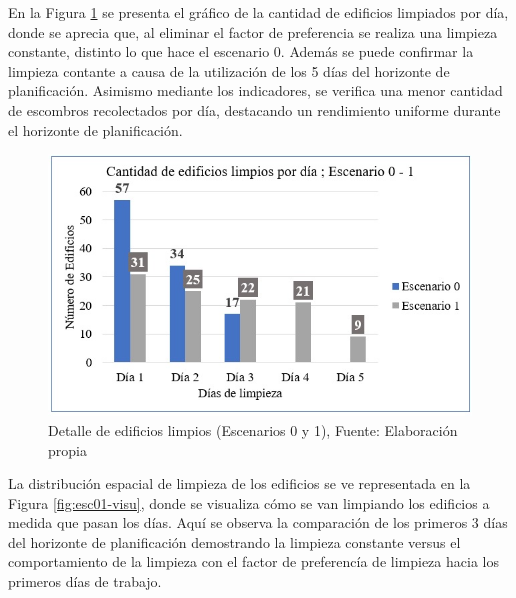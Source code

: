 \documentclass[12pt,a4paper]{article}
\begin{document}
En la Figura \ref{fig:esc01graf} se presenta el gráfico de la cantidad de edificios limpiados por día, donde se aprecia que, al eliminar el factor de preferencia se realiza una limpieza constante, distinto lo que hace el escenario 0. Además se puede confirmar la limpieza contante a causa de la utilización de los 5 días del horizonte de planificación. Asimismo mediante los indicadores, se verifica una menor cantidad de escombros recolectados por día, destacando un rendimiento uniforme durante el horizonte de planificación.


\begin{figure}[h!]
\centering
\includegraphics[scale=0.8]{Figuras/INDIC2.jpg} 
\caption{Detalle de edificios limpios (Escenarios 0 y 1), Fuente: Elaboración propia}
\label{fig:esc01graf}
\end{figure}



La distribución espacial de limpieza de los edificios se ve representada en la Figura \ref{fig:esc01-visu}, donde se visualiza cómo se van limpiando los edificios a medida que pasan los días. Aquí se observa la comparación de los primeros 3 días del horizonte de planificación demostrando la limpieza constante versus el comportamiento de la limpieza con el factor de preferencía de limpieza hacia los primeros días de trabajo.
\end{document}
